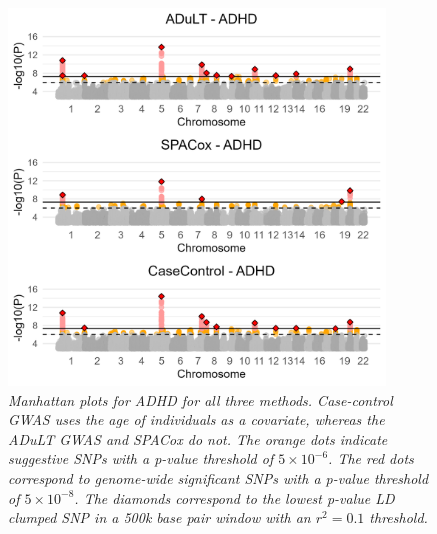 \begin{figure}[h] 
	\centering
	\includegraphics[width=10cm]{results/adult_manhattanPlot_ADHD}
	\caption[Manhattan plots from GWAS with the ADuLT phenotype, SPACox, and case-control status for ADHD]{
		\sl Manhattan plots for ADHD for all three methods. Case-control GWAS uses the age of individuals as a covariate, whereas the ADuLT GWAS and SPACox do not. The orange dots indicate suggestive SNPs with a p-value threshold of $ 5 \times 10^{-6} $. The red dots correspond to genome-wide significant SNPs with a p-value threshold of $ 5 \times 10^{-8} $. The diamonds correspond to the lowest p-value LD clumped SNP in a 500k base pair window with an $ r^2 = 0.1 $ threshold.}
	\label{fig:adult_ADHD}
\end{figure}

